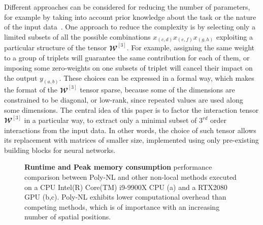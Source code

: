 \documentclass[10pt,twocolumn,letterpaper]{article}
\begin{document}
Different approaches can be considered for reducing the number of parameters, for example by taking into account prior knowledge about the task or the nature of the input data~\cite{kolda2009tensor, memisevic2010learning}. One approach to reduce the complexity is by selecting only a limited subsets of all the possible combinations $ x_{(c,d)} x_{(e,f)} x_{(g,h)}$ exploiting a particular structure of the tensor $\mathbfcal{W}^{[3]}$. For example, assigning the same weight to a group of triplets will guarantee the same contribution for each of them, or imposing some zero-weights on one subsets of triplet will cancel their impact on the output $y_{(a,b)}$. These choices can be expressed in a formal way, which makes the format of the $\mathbfcal{W}^{[3]}$ tensor sparse, because some of the dimensions are constrained to be diagonal, or low-rank, since repeated values are used along some dimensions. 
The central idea of this paper is to factor the interaction tensor $\mathbfcal{W}^{[3]}$ in a particular way, to extract only a minimal subset of $3^{rd}$ order interactions from the input data.
In other words, the choice of such tensor allows its replacement with matrices of smaller size, implemented using only pre-existing building blocks for neural networks. 

\begin{figure*}[t]
\hspace*{-0.7cm}
    
   \vspace{-0.25cm}
  \caption{ \textbf{Runtime and Peak memory consumption} performance comparison between Poly-NL and other non-local methods executed on a CPU Intel(R) Core(TM) i9-9900X CPU (a) and a RTX2080 GPU (b,c). Poly-NL exhibits lower computational overhead than competing methods, which is of importance with an increasing number of spatial positions. \vspace{-0.1cm}}
  \label{Fig:efficiency}
\hspace*{-1cm}
\end{figure*}
\end{document}
